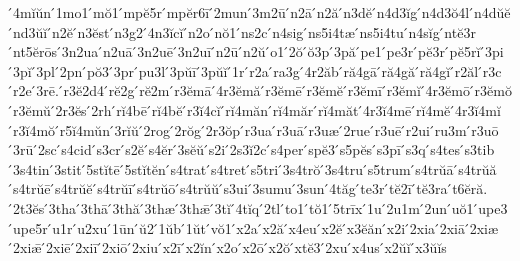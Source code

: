 {́4mĭŭn
́1mo1
́mŏ1
́mpĕ5r
́mpĕr6ī
́2mun
́3m2ū
́n2ā
́n2ă
́n3dĕ
́n4d3ĭg
́n4d3ŏ4l
́n4dŭĕ
́nd3ŭĭ
́n2ĕ
́n3ĕst
́n3g2
́4n3ĭcĭ
́n2o
́nŏ1
́ns2c
́n4sig
́ns5i4tæ
́ns5i4tu
́n4sĭg
́ntĕ3r
́nt5ĕrōs
́3n2ua
́n2uā
́3n2uē
́3n2uī
́n2ū
́n2ŭ
́o1
́2ŏ
́ŏ3p
́3pă
́pe1
́pe3r
́pĕ3r
́pĕ5rĭ
́3pi
́3pĭ
́3pl
́2pn
́pŏ3
́3pr
́pu3l
́3pŭī
́3pŭĭ
́1r
́r2a
́ra3g
́4r2ăb
́ră4gā
́ră4gă
́ră4gĭ
́r2ăl
́r3c
́r2e
́3rē.
́r3ĕ2d4
́rĕ2g
́rĕ2m
́r3ĕmā
́4r3ĕmă
́r3ĕmē
́r3ĕmĕ
́r3ĕmī
́r3ĕmĭ
́4r3ĕmō
́r3ĕmŏ
́r3ĕmŭ
́2r3ĕs
́2rh
́rĭ4bē
́rĭ4bĕ
́r3ĭ4cĭ
́rĭ4măn
́rĭ4măr
́rĭ4măt
́4r3ĭ4mē
́rĭ4mĕ
́4r3ĭ4mĭ
́r3ĭ4mŏ
́r5ĭ4mŭn
́3rĭŭ
́2rog
́2rŏg
́2r3ŏp
́r3ua
́r3uā
́r3uæ
́2rue
́r3uē
́r2ui
́ru3m
́r3uō
́3rū
́2sc
́s4cid
́s3cr
́s2ĕ
́s4ĕr
́3sĕŭ
́s2i
́2s3ĭ2c
́s4per
́spĕ3
́s5pĕs
́s3pī
́s3q
́s4tes
́s3tib
́3s4tin
́3stit
́5stĭtē
́5stĭtĕn
́s4trat
́s4tret
́s5tri
́3s4trŏ
́3s4tru
́s5trum
́s4trŭā
́s4trŭă
́s4trŭē
́s4trŭĕ
́s4trŭī
́s4trŭō
́s4trŭŭ
́s3ui
́3sumu
́3sun
́4tăg
́te3r
́tĕ2ī
́tĕ3ra
́t6ĕră.
́2t3ĕs
́3tha
́3thā
́3thă
́3thæ
́3thǣ
́3tĭ
́4tĭq
́2tl
́to1
́tŏ1
́5trīx
́1u
́2u1m
́2un
́uŏ1
́upe3
́upe5r
́u1r
́u2xu
́1ūn
́ŭ2
́1ŭb
́1ŭt
́vŏ1
́x2a
́x2ă
́x4eu
́x2ĕ
́x3ĕăn
́x2i
́2xia
́2xiā
́2xiæ
́2xiǣ
́2xiē
́2xiī
́2xiō
́2xiu
́x2ī
́x2ĭn
́x2o
́x2ō
́x2ŏ
́xtĕ3
́2xu
́x4us
́x2ŭĭ
́x3ŭĭs
}
